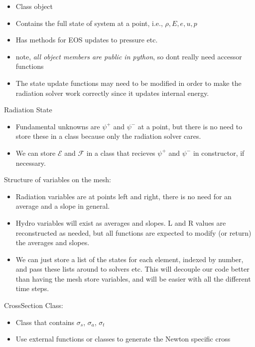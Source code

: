 \documentclass[preprint,12pt]{elsarticle}
\newcommand{\ER}{\mathcal{E}}
\newcommand{\FR}{\mathcal{F}}
\begin{document}
{\begin{enumerate}
{    \begin{itemize}
        \item Class object
        \item Contains the full state of system at a point, i.e., $\rho, E, e, u, p$
        \item Has methods for EOS updates to pressure etc.
        \item note, \emph{all object members are public in python}, so dont really need accessor
            functions
        \item The state update functions may need to be modified in order to make the radiation
            solver work correctly since it updates internal energy.
    \end{itemize}
    \item Radiation State
    \begin{itemize}
        \item Fundamental unknowns are $\psi^+$ and $\psi^-$ at a point, but there is
            no need to store these in a class because only the radiation solver
            cares.
        \item We can store $\ER$ and $\FR$ in a class that recieves $\psi^+$ and
            $\psi^-$ in constructor, if necessary.
    \end{itemize}
    \item Structure of variables on the mesh: 
        \begin{itemize}
            \item Radiation variables are at points left and right,
        there is no need for an average and a slope in general. 
            \item Hydro variables will
        exist as averages and slopes. L and R values are reconstructed as needed, but
        all functions are expected to modify (or return) the averages and slopes. 
            \item We can just store a list of the states for each element, indexed by
                number, and pass these lists around to solvers etc.  This will decouple our code better than having the mesh store
        variables, and will be easier with all the different time steps. 
    \end{itemize}
    \item CrossSection Class:
    \begin{itemize}
        \item Class that contains $\sigma_s$, $\sigma_a$, $\sigma_t$
        \item Use external functions or classes to generate the Newton specific cross

\end{itemize}}
\end{enumerate}}
\end{document}
